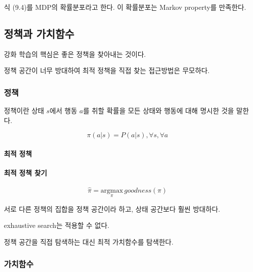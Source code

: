 \documentclass [12pt] {oblivoir}
\let\oldsubsubsection=\subsubsection
\renewcommand{\subsubsection}
{
  \filbreak
  \oldsubsubsection
}
\begin{document}
식 (9.4)를 MDP의 확률분포라고 한다. 이 확률분포는 Markov property를 만족한다.

\vspace{3mm}

\subsection{정책과 가치함수}

강화 학습의 핵심은  좋은 정책을 찾아내는 것이다.

정책 공간이 너무 방대하여 최적 정책을 직접 찾는 접근방법은 무모하다.

\subsubsection{정책}

정책이란 상태 $s$에서 행동 $a$를 취할 확률을 모든 상태와 행동에 대해 명시한 것을 말한다.

\begin{equation} \tag{9.5}
  \pi(a \vert s) = P(a \vert s), \forall s, \forall a
\end{equation}

\paragraph*{최적 정책}\mbox{}

\vspace{3mm}

\paragraph*{최적 정책 찾기}\mbox{}

\begin{equation} \tag{9.7}
  \hat{\pi} = \underset{\pi}{\mathrm{argmax}}\,goodness(\pi)
\end{equation}

서로 다른 정책의 집합을 정책 공간이라 하고, 상태 공간보다 훨씬 방대하다.

exhaustive search는 적용할 수 없다.

정책 공간을 직접 탐색하는 대신 최적 가치함수를 탐색한다.

\vspace{3mm}

\subsubsection{가치함수}
\end{document}
